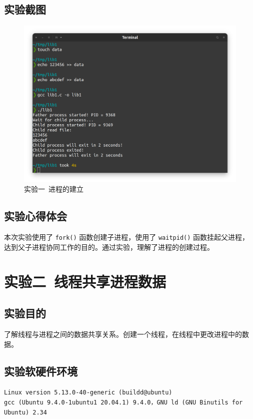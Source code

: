 \documentclass{article}
\begin{document}
		\subsection{实验截图}
			\begin{figure}[htbp]
				\centering
				\includegraphics[width=\textwidth]{lib1/Screenshot.png}
				\caption{实验一\ 进程的建立}
			\end{figure}

		\subsection{实验心得体会}
			本次实验使用了 \texttt{fork()} 函数创建子进程，使用了 \texttt{waitpid()} 函数挂起父进程，达到父子进程协同工作的目的。通过实验，理解了进程的创建过程。

	\section{实验二\ 线程共享进程数据}
		\subsection{实验目的}
			了解线程与进程之间的数据共享关系。创建一个线程，在线程中更改进程中的数据。

		\subsection{实验软硬件环境}
			\texttt{Linux version 5.13.0-40-generic (buildd@ubuntu) \\ gcc (Ubuntu 9.4.0-1ubuntu1~20.04.1) 9.4.0，GNU ld (GNU Binutils for Ubuntu) 2.34}
\end{document}

